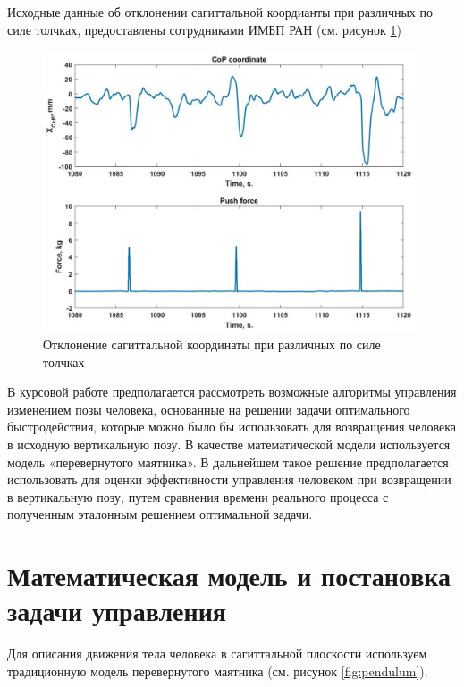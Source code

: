 \documentclass[a4paper,14pt]{article}
\theoremstyle{plain} %
\theoremstyle{definition} %
\theoremstyle{remark} %
\begin{document}
{Исходные данные об отклонении сагиттальной коордианты при различных по силе толчках, предоставлены сотрудниками ИМБП РАН (см. рисунок \ref{fig:pushes})
\begin{figure}[h!]
    \centering
    \includegraphics[]{Pushes.png}
    \caption{Отклонение сагиттальной координаты при различных по силе толчках}
    \label{fig:pushes}
\end{figure}

В курсовой работе предполагается рассмотреть возможные
алгоритмы управления изменением позы человека, основанные на решении задачи
оптимального быстродействия, которые можно было бы использовать для
возвращения человека в исходную вертикальную позу. В качестве математической модели
используется модель «перевернутого маятника». В дальнейшем
такое решение предполагается использовать для оценки эффективности управления человеком
при возвращении в вертикальную позу, путем сравнения
времени реального процесса с полученным эталонным решением оптимальной задачи.

\newpage
\section{Математическая модель и постановка задачи управления}
Для описания движения тела человека в сагиттальной плоскости используем традиционную модель перевернутого маятника \cite{falb} (см. рисунок \ref{fig:pendulum}).

}
\end{document}
